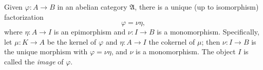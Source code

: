 Given $\varphi : A \to B$ in an abelian category $\mathfrak{A}$, there is a unique (up to isomorphism) factorization
$$
\varphi = \nu \eta,
$$
where $\eta : A \to I$ is an epimorphism and $\nu : I \to B$ is a monomorphism. Specifically, let $\mu : K \to A$ be the kernel of $\varphi$ and $\eta : A \to I$ the cokernel of $\mu$; then $\nu : I \to B$ is the unique morphism with $\varphi = \nu \eta$, and $\nu$ is a monomorphism. The object $I$ is called the \textit{image} of $\varphi$.
